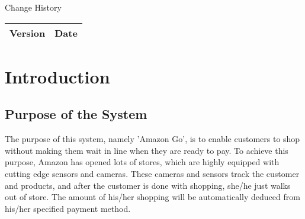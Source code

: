 \documentclass[11pt]{article}
\begin{document}


\newpage

\begin{center}
    \Huge{Change History} 
\end{center}{}
 


\begin{table}[H]
\begin{center}
    

\begin{tabular}{|l|l|}
\hline
\textbf{\Huge{Version}} & \textbf{\Huge{Date}}  \\ \hline
\end{tabular}
\end{center}
\end{table}

\newpage



\begin{flushleft}
    \tableofcontents
\end{flushleft}

\newpage

\begin{flushleft}
    \listoffigures
\end{flushleft}

\newpage

\begin{flushleft}
    \listoftables
\end{flushleft}

\newpage


\section{Introduction}

\subsection{Purpose of the System}
The purpose of this system, namely 'Amazon Go', is to enable customers to shop without making them wait in line when they are ready to pay. To achieve this purpose, Amazon has opened lots of stores, which are highly equipped with cutting edge sensors and cameras. These cameras and sensors track the customer and products, and after the customer is done with shopping, she/he just walks out of store. The amount of his/her shopping will be automatically deduced from his/her specified payment method.
    
\end{document}
